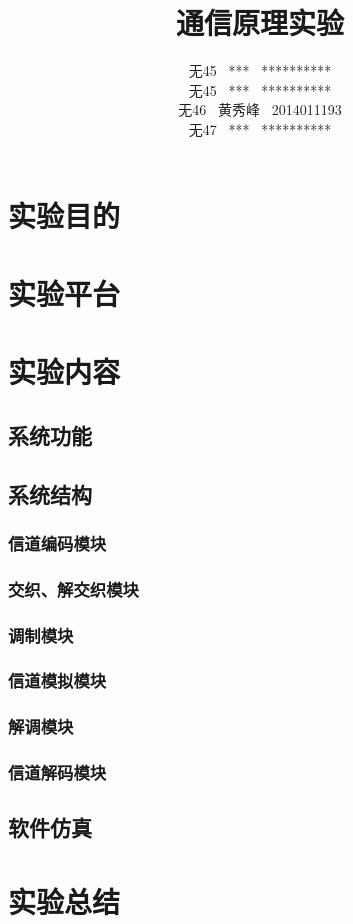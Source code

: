 \documentclass[UTF8]{ctexart}
\date{}
\title{\textbf{通信原理实验}}
\author{无45 \ *** \ **********\\
        无45 \ *** \ **********\\
        无46 \ 黄秀峰 \ 2014011193\\
        无47 \ *** \ **********}
\begin{document}
\maketitle

\section{实验目的}

\section{实验平台}

\section{实验内容}

\subsection{系统功能}

\subsection{系统结构}

\subsubsection{信道编码模块}


\subsubsection{交织、解交织模块}


\subsubsection{调制模块}

\subsubsection{信道模拟模块}

\subsubsection{解调模块}

\subsubsection{信道解码模块}


\subsection{软件仿真}


\section{实验总结}

\end{document}
